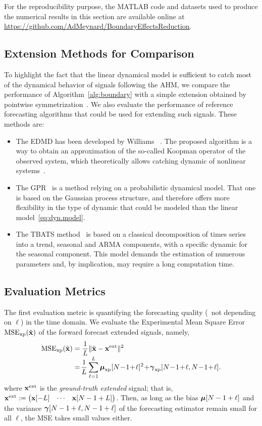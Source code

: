 For the reproducibility purpose, the MATLAB code and datasets used to produce the numerical results in this section are available online at \url{https://github.com/AdMeynard/BoundaryEffectsReduction}.


\subsection{Extension Methods for Comparison}
\label{sse:methods}
To highlight the fact that the linear dynamical model is sufficient to catch most of the dynamical behavior of signals following the AHM, we compare the performance of Algorithm~\ref{alg:boundary} with a simple extension obtained by pointwise symmetrization~\cite{Kharitonenko02wavelet}. We also evaluate the performance of reference forecasting algorithms that could be used for extending such signals. These methods are:
\begin{itemize}
\item The EDMD has been developed by Williams \etal~\cite{Williams15data}. The proposed algorithm is a way to obtain an approximation of the so-called Koopman operator of the observed system, which theoretically allows catching dynamic of nonlinear systems~\cite{Korda18linear}.
\item The GPR~\cite{Rasmussen06gaussian} is a method relying on a probabilistic dynamical model. That one is based on the Gaussian process structure, and therefore offers more flexibility in the type of dynamic that could be modeled than the linear model~\eqref{eq:dyn.model}.
\item The TBATS method~\cite{DeLivera11forecasting} is based on a classical decomposition of times series into a trend, seasonal and ARMA components, with a specific dynamic for the seasonal component. This model demands the estimation of numerous parameters and, by implication, may require a long computation time.
\end{itemize}


\subsection{Evaluation Metrics}

The first evaluation metric is quantifying the forecasting quality (\ie~not depending on $\ell$) in the time domain. We evaluate the Experimental Mean Square Error $\mathrm{MSE_{xp}}(\tilde{{\mathbf x}})$ of the forward forecast extended signals, namely,
\begin{align}
\label{eq:mse}
\mathrm{MSE_{\xp}}(\tilde\bx) &= \dfrac1{L}\|\tilde\bx -\bx^\mathrm{ext}\|^2 \\[-1mm]
\nonumber
&=\! \dfrac1{L}\sum_{\ell=1}^L \bmu_{\xp}[N\!-\!1\!+\!\ell]^2 \!+\! \bgamma_{\xp}[N\!-\!1\!+\!\ell,N\!-\!1\!+\!\ell] .
\end{align}
where ${\mathbf x}^\mathrm{ext}$ is the {\em ground-truth extended} signal; that is, ${\mathbf x}^\mathrm{ext} := \begin{pmatrix}{\mathbf x}[-L] & \cdots & {\mathbf x}[N-1+L] \end{pmatrix}$. Then, as long as the bias $\boldsymbol{\mu}[N-1+\ell]$ and the variance $\boldsymbol{\gamma}[N-1+\ell,N-1+\ell]$ of the forecasting estimator remain small for all $\ell$, the MSE takes small values either.



